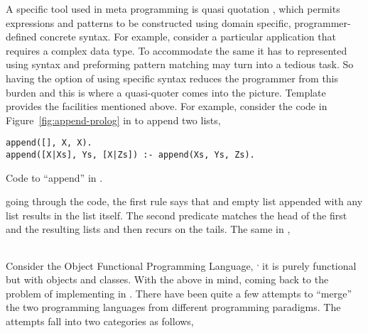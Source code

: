 \documentclass[thesis-solanki.tex]{subfiles}
\begin{document}
A specific tool used in meta programming is quasi quotation \cite{mainland2007s,haskellquasi,wikiquasi},
which permits
 expressions and patterns to be constructed using domain specific, programmer-defined concrete
syntax.
For example, consider a particular application that requires a complex data type.
To accommodate the same it has to represented using  syntax and preforming pattern matching may
turn into a tedious task.
So having the option of using specific syntax reduces the programmer from this burden and this is where a
quasi-quoter comes into the picture.
Template  provides the facilities mentioned above.
For example, consider the code in Figure~\ref{fig:append-prolog}
in  to append two lists,
\begin{code-list}[h]
\begin{verbatim}
append([], X, X).
append([X|Xs], Ys, [X|Zs]) :- append(Xs, Ys, Zs).
\end{verbatim}    
\vspace*{-0.8\baselineskip}
\caption{Code to ``append'' in \protect{}.}
\label{fig:append-prolog}
\end{code-list}
going through the code, the first rule says that and empty list appended with any list results in the list itself.
The second predicate matches the head of the first and the resulting lists and then recurs on the tails.
The same in ,
\inputminted[linenos]{haskell}{append.pl}

Consider the Object Functional Programming Language,  \cite{website:scala}\textsuperscript{,}
it is purely functional but with objects and classes.
With the above in mind, coming back to the problem of implementing  in .
There have been quite a few attempts to ``merge'' the two programming languages from different programming paradigms.
The attempts fall into two categories as follows,
\end{document}
